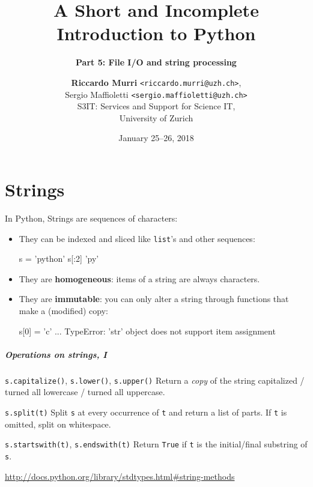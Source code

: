 \documentclass[english,serif,mathserif,xcolor=pdftex,dvipsnames,table]{beamer}
\title[4. Files and strings]{%
  A Short and Incomplete Introduction to Python
}
\subtitle{\bfseries Part 5: File I/O and string processing}
\author[R.~Murri]{%
  \textbf{Riccardo Murri} \texttt{<riccardo.murri@uzh.ch>}, \\
  Sergio Maffioletti \texttt{<sergio.maffioletti@uzh.ch>}
  \\
  S3IT: Services and Support for Science IT,
  \\
  University of Zurich
}
\date{January 25--26, 2018}
\begin{document}
\maketitle


\part{Strings}


\begin{frame}[fragile]
  In Python, Strings are sequences of characters:
  \begin{itemize}
  \item They can be indexed and sliced like \lstinline|list|'s and other sequences:
\begin{semiverbatim}\small
\In s = 'python'
\In s[:2]
\Out 'py'
\end{semiverbatim}
  \item They are \textbf{homogeneous}: items of a string are always characters.
  \item They are \textbf{immutable}: you can only alter a string through functions that make a (modified) copy:
\begin{semiverbatim}\small
\In s[0] = 'c'
...
TypeError: 'str' object does not support
item assignment
\end{semiverbatim}
  \end{itemize}

\end{frame}


\begin{frame}[fragile]
  \frametitle{Operations on strings, I}
  \begin{describe}{%
      \lstinline|s.capitalize()|,
      \lstinline|s.lower()|,
      \lstinline|s.upper()|}
    Return a \emph{copy} of the string capitalized / turned all lowercase /
    turned all uppercase.
  \end{describe}

  \begin{describe}{\lstinline|s.split(t)|}
    Split \texttt{s} at every occurrence of \texttt{t} and return a list
    of parts.  If \texttt{t} is omitted, split on whitespace.
  \end{describe}

  \begin{describe}{\lstinline|s.startswith(t)|,
      \lstinline|s.endswith(t)|}
    Return \texttt{True} if \texttt{t} is the initial/final substring
    of \texttt{s}.
  \end{describe}

  \begin{references}
    \url{http://docs.python.org/library/stdtypes.html#string-methods}
  \end{references}
\end{frame}
\end{document}
